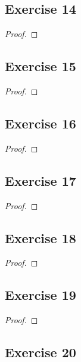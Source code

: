 \documentclass[14pt]{extarticle}
\begin{document}
\subsection{Exercise 14}

\begin{proof}

\end{proof}

\subsection{Exercise 15}

\begin{proof}

\end{proof}

\subsection{Exercise 16}

\begin{proof}

\end{proof}

\subsection{Exercise 17}

\begin{proof}

\end{proof}

\subsection{Exercise 18}

\begin{proof}

\end{proof}

\subsection{Exercise 19}

\begin{proof}

\end{proof}

\subsection{Exercise 20}
\end{document}
